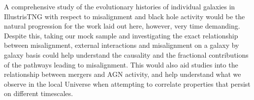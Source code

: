 A comprehensive study of the evolutionary histories of individual galaxies in IllustrisTNG with respect to misalignment and black hole activity would be the natural progression for the work laid out here, however, very time demanding. Despite this, taking our mock sample and investigating the exact relationship between misalignment, external interactions and misalignment on a galaxy by galaxy basis could help understand the causality and the fractional contributions of the pathways leading to misalignment. This would also aid studies into the relationship between mergers and AGN activity, and help understand what we observe in the local Universe when attempting to correlate properties that persist on different timescales.